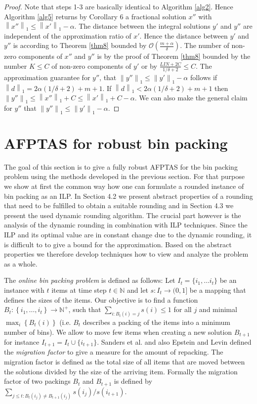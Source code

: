 \documentclass[a4paper,11pt]{article}
\newcommand{\menge}[1]{\left\{#1\right\}}
\newcommand{\nor}[1]{\left\|#1\right\|}
\begin{document}
\begin{proof}
Note that steps 1-3 are basically identical to Algorithm \ref{alg2}. Hence Algorithm \ref{alg5} returns by Corollary 6 a fractional
solution $x''$ with $\nor{x''}_1 \leq \nor{x'}_1 - \alpha$. The distance between the integral solutions $y'$ 
and $y''$ are independent of the approximation ratio of $x'$. Hence the distance between $y'$ and $y''$ is
according to Theorem \ref{thm8} bounded by $\mathcal{O}(\frac{m + \alpha}{\delta})$. The number of non-zero components of
$x''$ and $y''$
is by the proof of Theorem \ref{thm8} bounded by the number $K \leq C$ of non-zero components of $y'$ or by 
$\frac{\mathit{LIN} +2C}{1/ \delta +2} \leq C$.
The approximation guarantee for $y''$, that $\nor{y''}_1 \leq \nor{y'}_1 - \alpha$ follows if 
$\nor{d}_1 = 2 \alpha (1/ \delta +2) +m+1$. If $\nor{d}_1 < 2 \alpha (1/ \delta +2) +m+1$ then $\nor{y''}_1 \leq 
\nor{x''}_1 + C \leq \nor{x'}_1 + C - \alpha$.
We can also make the general claim for $y''$ that $\nor{y''}_1 \leq \nor{y'}_1 - \alpha$.
\end{proof}

\section{AFPTAS for robust bin packing}
\label{sec:bin-packing}
The goal of this section is to give a fully robust AFPTAS for the bin packing
problem using the methods developed in the previous section. For that purpose we show at first the common way how one
can formulate a rounded instance of bin packing as an ILP. In Section 4.2 we present abstract properties
of a rounding that need to be fulfilled to obtain a suitable rounding and in Section 4.3 we present the used
dynamic rounding algorithm. The crucial part however is the analysis of the dynamic rounding in combination with ILP
techniques. Since the ILP and its optimal value are in constant change due to the dynamic rounding, it is difficult to 
to give a bound for the approximation. Based on the abstract properties we therefore develop techniques how
to view and analyze the problem as a whole. 

The \emph{online bin packing problem} is defined as follows:
Let $I_t = \{i_1, \ldots i_t\}$ be an instance with $t$ items at time step $t \in \mathbb{N}$
and let $s:I_t \to (0,1]$ be a mapping that defines the sizes of the items.
Our objective is to find a function $B_{t}:\menge{i_1,\ldots,i_t}\to
\mathbb{N}^+$, such that $\sum_{i:B_{t}(i)=j}s(i)\leq 1$ for all
$j$ and minimal $\max_{i}\menge{B_{t}(i)}$ (i.e. $B_t$ describes a packing of the items into a minimum number
of bins). We allow to move
few items when creating a new solution $B_{t+1}$ for instance $I_{t+1} = I_t \cup \{i_{t+1}\}$. 
Sanders et al. \cite{sanders2009} and also Epstein and Levin \cite{epstein2006robust}
defined the \emph{migration factor} to give a measure for the amount of repacking. 
The migration factor is defined as the total size of all items that are
moved between the solutions divided by the size of the arriving item.
Formally the migration factor of two packings $B_t$ and $B_{t+1}$ is defined by 
$\sum_{j \leq t: B_t(i_j) \neq B_{t+1}(i_j)} s(i_j)/s(i_{t+1})$.
\end{document}
